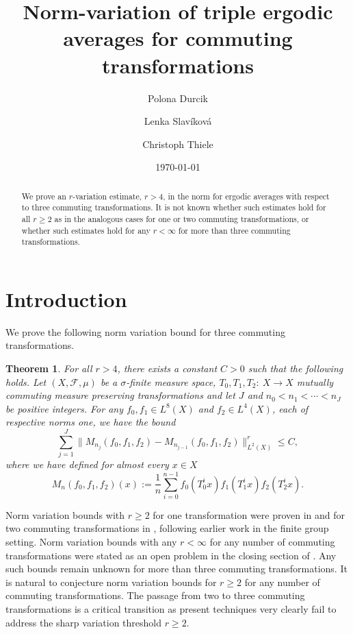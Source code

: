 \documentclass[12pt,reqno]{amsart}
\title[Norm-variation of triple ergodic averages]{Norm-variation of triple ergodic averages for commuting transformations}
\author[P. Durcik]{Polona Durcik}
\author[L. Slav\'ikov\'a]{Lenka Slav\'ikov\'a}
\author[C. Thiele]{Christoph Thiele}
\date{\today}
\theoremstyle{plain}
\newtheorem{theorem}{Theorem}[section]
\theoremstyle{definition}
\numberwithin{equation}{section}
\begin{document}

\begin{abstract}
    We prove an $r$-variation estimate, $r>4$, in the norm for ergodic averages with respect to three commuting transformations. It is not known whether
    such estimates hold for all $r\ge 2$ as in the analogous cases for one or two commuting transformations, or whether such estimates hold for any $r<\infty$ for more than three commuting transformations.
\end{abstract} 
 
\maketitle

 

\section{Introduction}

\label{introsection}

We prove the following norm variation bound for three commuting transformations.
\begin{theorem}\label{thm:ergodicthm}
For all $r>4$, there exists a constant $C>0$ such that the following holds. Let $(X,\mathcal{F},\mu)$ be a $\sigma$-finite measure space,  $T_0,T_1,T_2\colon~X\to X$   mutually commuting measure preserving transformations and let $J$ and $n_0<n_1<\cdots<n_J$ be positive integers. For any   $f_0,f_1\in L^8(X)$ and $f_2 \in L^4(X)$,  each of respective norms one,  we have the bound
\begin{equation*}
\sum_{j=1}^{J} \|M_{n_j}(f_0,f_1,f_2) - M_{n_{j-1}}(f_0,f_1,f_2)\|_{{L}^2(X)}^r \leq C ,
\end{equation*}
where we have defined for almost every $x\in X$ 
\begin{equation*}%
M_{n}(f_0,f_1,f_2)(x) := \frac{1}{n}\sum_{i=0}^{n-1} f_0(T_0^i x) f_1(T_1^i x) f_2(T_2^i x).
\end{equation*}
\end{theorem}

Norm variation bounds with $r\ge 2$ for one transformation were proven in \cite{MR1389625}
and for two commuting transformations in \cite{MR3904183},
following earlier work \cite{MR3480347} in the finite group setting. 
Norm variation bounds with any $r<\infty$  for any number of commuting transformations were stated as an open problem in the closing section of \cite{MR3345161}. 
Any such bounds remain unknown for more than three
commuting transformations. 
It is natural to conjecture norm variation bounds for
$r\ge 2$ for any number of commuting transformations. The passage from two to three commuting transformations is a critical transition as present techniques very clearly fail to address the sharp variation threshold $r\ge 2$. 
 
\end{document}

